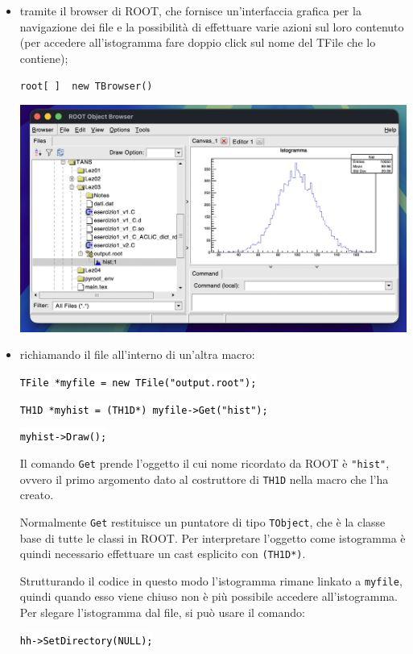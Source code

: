 \documentclass[10pt]{article}
\newcommand{\ttt}{\texttt}
\newcommand{\tcpp}[1]{\hspace{10pt}\colorbox{background}{\textcolor{black}{\texttt{#1}}}}
\newcommand{\troot}[1]{\hspace{10pt}\colorbox{bashbackground}{\textcolor{bashtext}{\texttt{root[~]~~#1}}}}
\begin{document}
\begin{itemize}
    \item tramite il browser di ROOT, che fornisce un'interfaccia grafica per la navigazione dei file e la possibilità di effettuare varie azioni sul loro contenuto (per accedere all'istogramma fare doppio click sul nome del TFile che lo contiene);
        
        \vspace{5pt}

        \troot{new TBrowser()}

        \vspace{5pt}
    
        \begin{center}
            \includegraphics[width=0.6\linewidth]{Browser.png}
        \end{center}

    \item richiamando il file all'interno di un'altra macro:
    
        \tcpp{TFile *myfile = new TFile("output.root");}

        \tcpp{TH1D *myhist = (TH1D*) myfile->Get("hist");}

        \tcpp{myhist->Draw();}

        Il comando \ttt{Get} prende l'oggetto il cui nome ricordato da ROOT è \ttt{"hist"}, ovvero il primo argomento dato al costruttore di \ttt{TH1D} nella macro che l'ha creato.

        Normalmente \ttt{Get} restituisce un puntatore di tipo \ttt{TObject}, che è la classe base di tutte le classi in ROOT. Per interpretare l'oggetto come istogramma è quindi necessario effettuare un cast esplicito con \ttt{(TH1D*)}.

        \vspace{5pt}

        Strutturando il codice in questo modo l'istogramma rimane linkato a \ttt{myfile}, quindi quando esso viene chiuso non è più possibile accedere all'istogramma. Per slegare l'istogramma dal file, si può usare il comando:

        \tcpp{hh->SetDirectory(NULL);}

\end{itemize}
\end{document}
